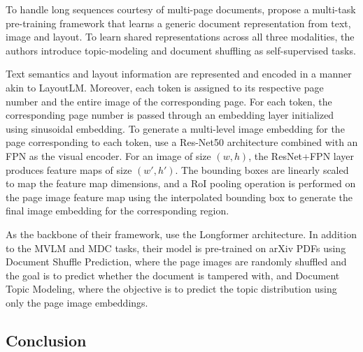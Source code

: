 To handle long sequences courtesy of multi-page documents, \citet{pramanik2020towards} propose a multi-task pre-training framework that learns a generic document representation from text, image and layout. To learn shared representations across all three modalities, the authors introduce topic-modeling and document shuffling as self-supervised tasks.

Text semantics and layout information are represented and encoded in a manner akin to  LayoutLM. Moreover, each token is assigned to its respective page number and the entire image of the corresponding page. For each token, the corresponding page number is passed through an embedding layer initialized using sinusoidal embedding. To generate a multi-level image embedding for the page corresponding to each token, \citet{pramanik2020towards} use a Res-Net50 \citep{he2016deep} architecture combined with an \ac{FPN} \citep{lin2017feature} as the visual encoder. For an image of size $(w, h)$, the ResNet+FPN layer produces feature maps of size $(w', h')$. The bounding boxes are linearly scaled to map the feature map dimensions, and a \ac{RoI} pooling operation is performed on the page image feature map using the interpolated bounding box to generate the final image embedding for the corresponding region.

As the backbone of their framework, \citet{pramanik2020towards} use the Longformer architecture. In addition to the \ac{MVLM} and \ac{MDC} tasks, their model is pre-trained on arXiv PDFs \citep{arxiv2020} using Document Shuffle Prediction, where the page images are randomly shuffled and the goal is to predict whether the document is tampered with, and Document Topic Modeling, where the objective is to predict the topic distribution using only the page image embeddings.



\subsection{Conclusion}



\acresetall

